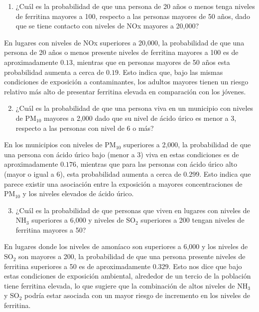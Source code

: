 \documentclass[12pt, letterpaper]{report}
\begin{document}
\begin{enumerate}
    \item ¿Cuál es la probabilidad de que una persona de 20 años o menos tenga niveles de ferritina mayores a 100, respecto a las personas mayores de 50 años, dado que se tiene contacto con niveles de NOx mayores a 20,000?
\end{enumerate}

En lugares con niveles de NOx superiores a 20,000, la probabilidad de que una persona de 20 años o menos presente niveles de ferritina mayores a 100 es de aproximadamente \(0.13\), mientras que en personas mayores de 50 años esta probabilidad aumenta a cerca de \(0.19\). Esto indica que, bajo las mismas condiciones de exposición a contaminantes, los adultos mayores tienen un riesgo relativo más alto de presentar ferritina elevada en comparación con los jóvenes.\\

\begin{enumerate}
    \setcounter{enumi}{1}
    \item ¿Cuál es la probabilidad de que una persona viva en un municipio con niveles de \( \text{PM}_{10} \) mayores a 2,000 dado que su nivel de ácido úrico es menor a 3, respecto a las personas con nivel de 6 o más?
\end{enumerate}

En los municipios con niveles de \( \text{PM}_{10} \) superiores a 2,000, la probabilidad de que una persona con ácido úrico bajo (menor a 3) viva en estas condiciones es de aproximadamente \(0.176\), mientras que para las personas con ácido úrico alto (mayor o igual a 6), esta probabilidad aumenta a cerca de \(0.299\). Esto indica que parece existir una asociación entre la exposición a mayores concentraciones de \( \text{PM}_{10} \) y los niveles elevados de ácido úrico.

\begin{enumerate}
    \setcounter{enumi}{2}    
    \item ¿Cuál es la probabilidad de que personas que viven en lugares con niveles de \( \text{NH}_3 \) superiores a 6,000 y niveles de \( \text{SO}_2 \) superiores a 200 tengan niveles de ferritina mayores a 50?
\end{enumerate}

 En lugares donde los niveles de amoníaco son superiores a 6,000 y los niveles de \( \text{SO}_2 \) son mayores a 200, la probabilidad de que una persona presente niveles de ferritina superiores a 50 es de aproximadamente \(0.329\). Esto nos dice que bajo estas condiciones de exposición ambiental, alrededor de un tercio de la población tiene ferritina elevada, lo que sugiere que la combinación de altos niveles de \( \text{NH}_3 \) y \( \text{SO}_2 \) podría estar asociada con un mayor riesgo de incremento en los niveles de ferritina.
\end{document}
